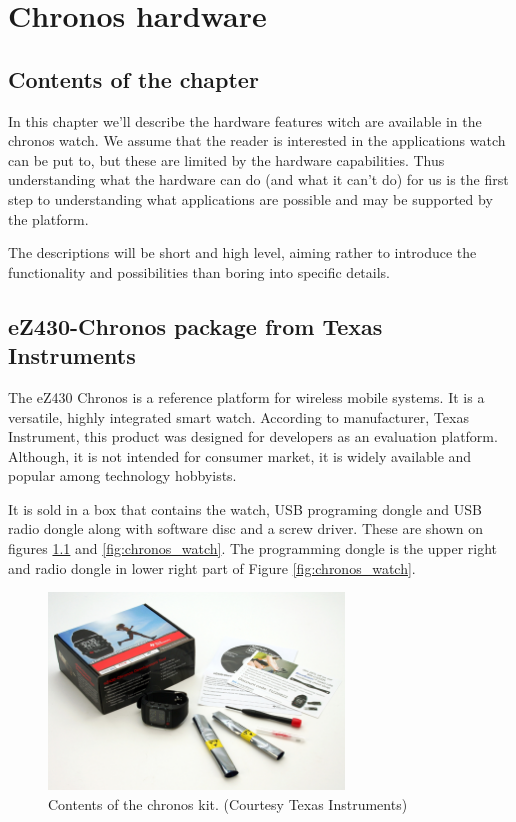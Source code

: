 \chapter{Chronos hardware}

\section{Contents of the chapter}

In this chapter we'll describe the hardware features witch are
available in the chronos watch. We assume that the reader is
interested in the applications watch can be put to, but these are
limited by the hardware capabilities. Thus understanding what the
hardware can do (and what it can't do) for us is the first step to
understanding what applications are possible and may be supported by
the platform.

The descriptions will be short and high level, aiming rather to
introduce the functionality and possibilities than boring into specific
details.

\section{eZ430-Chronos package from Texas Instruments}

The eZ430 Chronos is a reference platform for wireless mobile systems.
It is a versatile, highly integrated smart watch.  According to
manufacturer, Texas Instrument, this product was designed for
developers as an evaluation platform.  Although, it is not intended
for consumer market, it is widely available and popular among
technology hobbyists.

It is sold in a box that contains the watch, USB programing dongle and
USB radio dongle along with software disc and a screw driver. These
are shown on figures \ref{fig:chronos_kit} and \ref{fig:chronos_watch}.
The programming dongle is the upper right and radio dongle in
lower right part of Figure \ref{fig:chronos_watch}.

\begin{figure}[h]
  \centering
  \includegraphics[width=0.7\textwidth]{img/chronos_kit.jpg}
  \caption{Contents of the chronos kit. (Courtesy Texas Instruments)}
  \label{fig:chronos_kit}
\end{figure}

